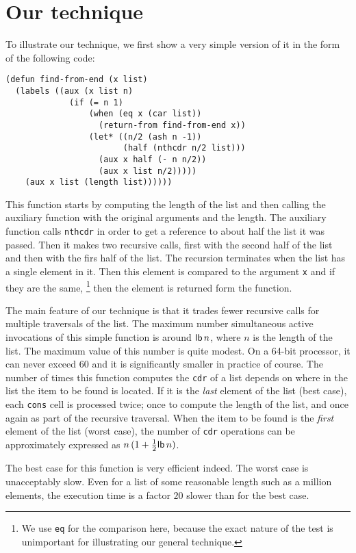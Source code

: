 \section{Our technique}

To illustrate our technique, we first show a very simple version of it
in the form of the following code:

{\small\begin{verbatim}
(defun find-from-end (x list)
  (labels ((aux (x list n)
             (if (= n 1)
                 (when (eq x (car list))
                   (return-from find-from-end x))
                 (let* ((n/2 (ash n -1))
                        (half (nthcdr n/2 list)))
                   (aux x half (- n n/2))
                   (aux x list n/2)))))
    (aux x list (length list))))))
\end{verbatim}}

This function starts by computing the length of the list and then
calling the auxiliary function with the original arguments and the
length.  The auxiliary function calls \texttt{nthcdr} in order to get
a reference to about half the list it was passed.  Then it makes two
recursive calls, first with the second half of the list and then with
the firs half of the list.  The recursion terminates when the list has
a single element in it.  Then this element is compared to the argument
\texttt{x} and if they are the same,%
\footnote{We use \texttt{eq} for the comparison here, because the
  exact nature of the test is unimportant for illustrating our general
  technique.}
then the element is returned form the function.

The main feature of our technique is that it trades fewer recursive
calls for multiple traversals of the list.  The maximum number%
simultaneous active invocations of this simple function is around
$\mathsf{lb}\thinspace n$, where $n$ is the length of the list.  The
maximum value of this number is quite modest.  On a 64-bit processor,
it can never exceed $60$ and it is significantly smaller in practice
of course.  The number of times this function computes the
\texttt{cdr} of a list depends on where in the list the item to be
found is located.  If it is the \emph{last} element of the list (best
case), each \texttt{cons} cell is processed twice; once to compute the
length of the list, and once again as part of the recursive traversal.
When the item to be found is the \emph{first} element of the list
(worst case), the number of \texttt{cdr} operations can be
approximately expressed as $n\thinspace (1 + {1 \over
  2}\mathsf{lb}\thinspace n)$.

The best case for this function is very efficient indeed.%
The worst case is unacceptably slow.  Even for a list of some
reasonable length such as a million elements, the execution time is a
factor $20$ slower than for the best case.
